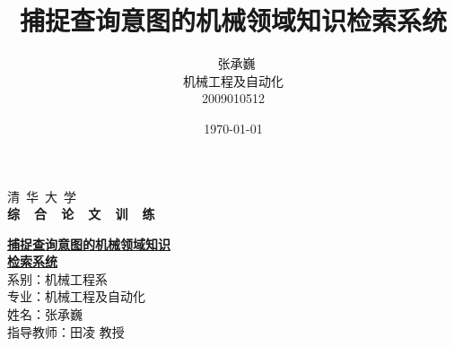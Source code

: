 \documentclass[12pt,a4paper]{article}
\title{\yihao\textbf{捕捉查询意图的机械领域知识检索系统}}
\author{\xiaosihao\ 张承巍\\机械工程及自动化\\2009010512}
\date{\today}
\newcommand{\xiaochu}{\fontsize{36pt}{\baselineskip}\selectfont}
\newcommand{\yihao}{\fontsize{26pt}{\baselineskip}\selectfont}
\newcommand{\erhao}{\fontsize{22pt}{\baselineskip}\selectfont}
\newcommand{\sanhao}{\fontsize{16pt}{\baselineskip}\selectfont}
\renewcommand{\today}{\number\year \ 年\ \number\month \ 月\ \number\day \ 日}
\begin{document}
\begin{titlepage}
\begin{center}


\phantom{Start!}

\vspace{1cm} 

{\yihao \lishu 清\ 华\ 大\ 学}\\[1.5cm]

\textbf{\xiaochu \bfseries {综\ \ 合\ \ 论\ \ 文\ \ 训\ \ 练} }\\[2.5cm]

\end{center}
\textbf{\erhao{题目：}\yihao \underline{捕捉查询意图的机械领域知识}\\ \hspace*{21mm} \underline{检索系统}}\\[4cm]




{
\FangSong \sanhao 
\hspace{11mm}系\hspace{11mm}别：机械工程系\\[0.25cm]

\hspace{11mm}专\hspace{11mm}业：机械工程及自动化\\[0.25cm]

\hspace{11mm}姓\hspace{11mm}名：张承巍\\[0.25cm]

\hspace{11mm}指导教师：田\quad 凌 教授\\[2cm]

}



\center{\SimSun \large \today}

\newpage


\end{titlepage}
\end{document}
